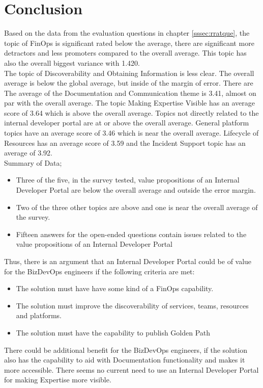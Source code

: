\documentclass[a4paper,12pt]{article}
\begin{document}
    \section{Conclusion}
    \label{sec:conclusion}
    Based on the data from the evaluation questions in chapter \ref{sssec:rratque}, the topic of
    FinOps is significant rated below the average, there are significant more detractors and
    less promoters compared to the overall average.
    This topic has also the overall biggest variance with 1.420.\\
    The topic of Discoverability and Obtaining Information is less clear.
    The overall average is below the global average, but inside of the margin of error. There are
    The average of the Documentation and Communication theme is 3.41, almost on par with the overall average.
    The topic Making Expertise Visible has an average score of 3.64 which is above the overall average.
    Topics not directly related to the internal developer portal are at or above the overall average.
    General platform topics have an average score of 3.46 which is near the overall average.
    Lifecycle of Resources has an average score of 3.59 and the Incident Support topic has an average of 3.92.\\
    Summary of Data;
    \begin{itemize}
        \item Three of the five, in the survey tested, value propositions of an Internal Developer Portal are below the overall average and outside the error margin.
        \item Two of the three other topics are above and one is near the overall average of the survey.
        \item Fifteen answers for the open-ended questions contain issues related to the value propositions of an Internal Developer Portal
    \end{itemize}
    Thus, there is an argument that an Internal Developer Portal could be of value for the BizDevOps engineers if the following
    criteria are met:
    \begin{itemize}
        \item The solution must have have some kind of a FinOps capability.
        \item The solution must improve the discoverability of services, teams, resources and platforms.
        \item The solution must have the capability to publish Golden Path
    \end{itemize}
    There could be additional benefit for the BizDevOps engineers, if the solution also has the capability to aid with
    Documentation functionality and makes it more accessible.
    There seems no current need to use an Internal Developer Portal for making Expertise more visible.
\end{document}
